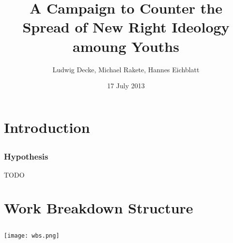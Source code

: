 \documentclass{beamer}
\title{A Campaign to Counter the Spread of New Right Ideology amoung Youths}
\institute{English in Project Management\\Sprachenzentrum der Universität Leipzig}
\author{Ludwig Decke, Michael Rakete, Hannes Eichblatt}
\date{17 July 2013}
\begin{document}

\frame[plain]{\maketitle}

\section{Introduction}
\subsection{}

\begin{frame}
 \frametitle{Hypothesis}
 \begin{block}{TODO}
 \end{block}
\end{frame}

\section{Work Breakdown Structure}
\subsection{}
\begin{frame}
  \texttt{[image: wbs.png]}
\end{frame}
\end{document}
